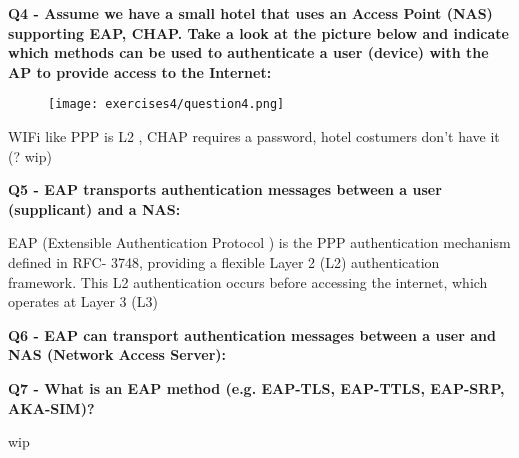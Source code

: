 \textbf{Q4 - Assume we have a small hotel that uses an Access Point (NAS) supporting EAP, CHAP. Take a look at the picture below and indicate which methods can be used to authenticate a user (device) with the AP to provide access to the Internet:}
\begin{figure}[h]
    \centering
    \texttt{[image: exercises4/question4.png]}
\end{figure}
\textcolor{Comment}{WIFi like PPP is L2 , CHAP requires a password, hotel costumers don't have it (? wip)  }

\textbf{Q5 - EAP transports authentication messages between a user (supplicant) and a NAS:}
\textcolor{Comment}{EAP (Extensible Authentication Protocol ) is the PPP authentication mechanism defined in RFC-
3748, providing a flexible Layer 2 (L2) authentication framework. This L2 authentication
occurs before accessing the internet, which operates at Layer 3 (L3)}

\textbf{Q6 - EAP can transport authentication messages between a user and NAS (Network Access Server):}

\textbf{Q7 - What is an EAP method (e.g. EAP-TLS, EAP-TTLS, EAP-SRP, AKA-SIM)?}
\textcolor{Comment}{wip}

